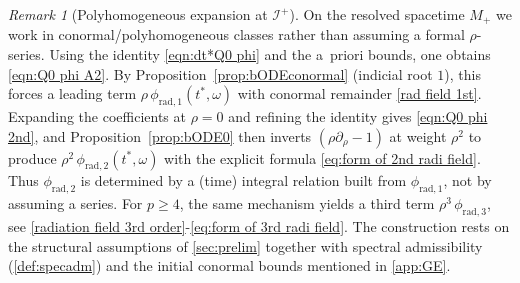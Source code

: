 \documentclass[10pt,a4paper,reqno]{amsart}
\theoremstyle{definition}
\theoremstyle{remark}
\newtheorem{remark}[theorem]{Remark}
\numberwithin{equation}{section}
\begin{document}
\begin{remark}[Polyhomogeneous expansion at $\mathscr I^+$]
On the resolved spacetime $M_+$ we work in conormal/polyhomogeneous classes rather
than assuming a formal $\rho$-series. Using the identity \eqref{eqn:dt*Q0 phi}
and the a~priori bounds, one obtains \eqref{eqn:Q0 phi A2}.
By Proposition~\ref{prop:bODEconormal} (indicial root $1$), this forces a leading term
$\rho\,\phi_{\mathrm{rad},1}(t^*,\omega)$ with conormal remainder \eqref{rad field 1st}.
Expanding the coefficients at $\rho=0$ and refining the identity gives \eqref{eqn:Q0 phi 2nd}, and
Proposition~\ref{prop:bODE0} then inverts $(\rho\partial_\rho-1)$ at weight $\rho^2$ to produce
$\rho^2\,\phi_{\mathrm{rad},2}(t^*,\omega)$ with the explicit formula \eqref{eq:form of 2nd radi field}. Thus $\phi_{\mathrm{rad},2}$ is determined by a (time) integral relation built from $\phi_{\mathrm{rad},1}$, not by assuming a series.
For $p\ge4$, the same mechanism yields a third term $\rho^3\,\phi_{\mathrm{rad},3}$, see
\eqref{radiation field 3rd order}-\eqref{eq:form of 3rd radi field}. The construction rests on the structural assumptions of \cref{sec:prelim} together with
spectral admissibility (\cref{def:specadm}) and the initial conormal bounds mentioned in \cref{app:GE}.
\end{remark}
\end{document}
